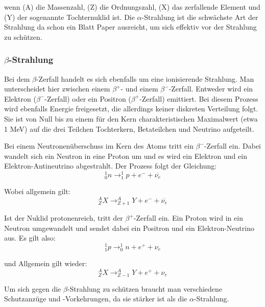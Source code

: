 wenn (A) die Massenzahl, (Z) die Ordnungszahl, (X) das zerfallende Element und (Y) der sogenannte Tochternuklid ist. Die $\alpha$-Strahlung ist die schwächste Art der Strahlung da schon ein Blatt Paper ausreicht, um sich effektiv vor der Strahlung zu schützen.

	\subsubsection*{$\beta$-Strahlung}
	Bei dem $\beta$-Zerfall handelt es sich ebenfalls um eine ionisierende Strahlung. Man unterscheidet hier zwischen einem $\beta^{+}$- und einem $\beta^{-}$-Zerfall. Entweder wird ein Elektron ($\beta^{-}$-Zerfall) oder ein Positron ($\beta^{+}$-Zerfall) emittiert. Bei diesem Prozess wird ebenfalls Energie freigesetzt, die allerdings keiner diskreten Verteilung folgt. Sie ist von Null bis zu einem für den Kern charakteristischen Maximalwert (etwa 1 MeV) auf die drei Teilchen Tochterkern, Betateilchen und Neutrino aufgeteilt.

Bei einem Neutronenüberschuss im Kern des Atoms tritt ein $\beta^{-}$-Zerfall ein. Dabei wandelt sich ein Neutron in eine Proton um und es wird ein Elektron und ein Elektron-Antineutrino abgestrahlt. Der Prozess folgt der Gleichung:
	\begin{equation}
	^{1}_{0}n \rightarrow ^{1}_{1}p + e^{-} + \overline{\nu_{e}}
	\end{equation}

Wobei allgemein gilt:
	\begin{equation}
	^{A}_{Z}X \rightarrow ^{A}_{Z+1}Y + e^{-} + \overline{\nu_{e}}
	\end{equation}

Ist der Nuklid protonenreich, tritt der $\beta^{+}$-Zerfall ein. Ein Proton wird in ein Neutron umgewandelt und sendet dabei ein Positron und ein Elektron-Neutrino aus. Es gilt also:
	\begin{equation}
	^{1}_{1}p \rightarrow ^{1}_{0}n + e^{+} + \nu_{e}
	\end{equation}

und Allgemein gilt wieder:
	\begin{equation}
	^{A}_{Z}X \rightarrow ^{A}_{Z-1}Y + e^{+} + \nu_{e}
	\end{equation}

Um sich gegen die $\beta$-Strahlung zu schützen braucht man verschiedene Schutzanzüge und -Vorkehrungen, da sie stärker ist als die $\alpha$-Strahlung.

